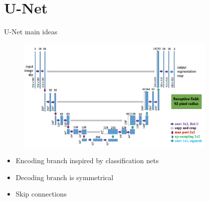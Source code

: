 \documentclass[xcolor=pdftex,dvipsnames,table,mathserif]{beamer}
\begin{document}
\section{U-Net}


\begin{frame}{U-Net main ideas}

      \begin{figure}
        \includegraphics[width=0.86\textwidth]{unet_lo}
      \end{figure}


      \begin{itemize}
      \item Encoding branch inspired by classification nets
      \item Decoding branch is symmetrical
      \item Skip connections
      \end{itemize}


\end{frame}
\end{document}
